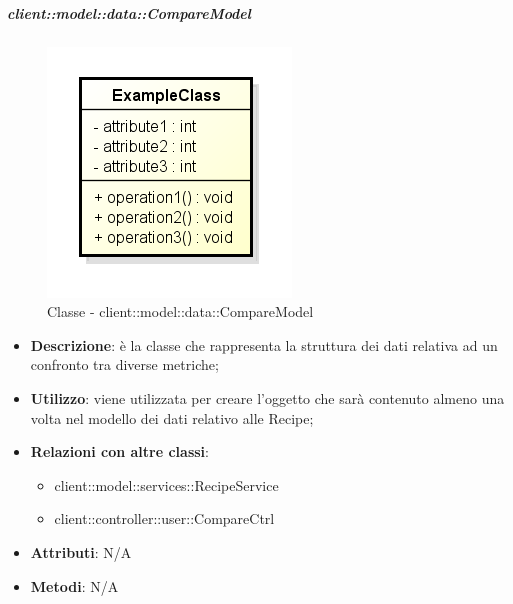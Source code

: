 		\subparagraph{client::model::data::CompareModel} %
		\label{subp:client_model_data_comparemodel}
			\begin{figure}[htbp]
				\centering
				\centerline{\includegraphics[scale=0.7]{./images/client/classes/example_class.png}}
				\caption{Classe - client::model::data::CompareModel}
			\end{figure}
			\begin{itemize}
				\item \textbf{Descrizione}: è la classe che rappresenta la struttura dei dati relativa ad un confronto tra diverse metriche;
				\item \textbf{Utilizzo}: viene utilizzata per creare l'oggetto che sarà contenuto almeno una volta nel modello dei dati relativo alle Recipe;
				\item \textbf{Relazioni con altre classi}:
					\begin{itemize}
						\item client::model::services::RecipeService
						\item client::controller::user::CompareCtrl
					\end{itemize}
				\item \textbf{Attributi}: N/A
				\item \textbf{Metodi}: N/A
			\end{itemize}

